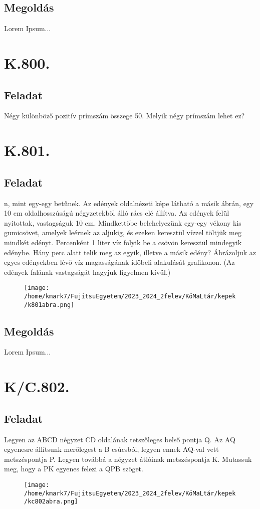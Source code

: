 \documentclass[a4paper,12pt]{article}
\begin{document}
\subsection*{Megoldás}
Lorem Ipsum...

\section*{\Large K.800.}\label{par:2}
\subsection*{Feladat}
Négy különböző pozitív prímszám összege 50. Melyik négy prímszám lehet ez?

\section*{\Large K.801.}\label{par:3}
\subsection*{Feladat}
n, mint egy-egy betűnek. Az edények oldalnézeti képe látható a másik ábrán, egy 10 cm oldalhosszúságú négyzetekből álló rács elé állítva. Az edények felül nyitottak, vastagságuk 10 cm. Mindkettőbe belehelyezünk egy-egy vékony kis gumicsövet, amelyek leérnek az aljukig, és ezeken keresztül vízzel töltjük meg mindkét edényt. Percenként 1 liter víz folyik be a csövön keresztül mindegyik edénybe. Hány perc alatt telik meg az egyik, illetve a másik edény? Ábrázoljuk az egyes edényekben lévő víz magasságának időbeli alakulását grafikonon. (Az edények falának vastagságát hagyjuk figyelmen kívül.) 
\begin{figure}[htp]
\centering
\texttt{[image: /home/kmark7/FujitsuEgyetem/2023\_2024\_2felev/KöMaLtár/kepek/k801abra.png]}
\label{}
\end{figure}
\subsection*{Megoldás}
Lorem Ipsum...

\section*{\Large K/C.802.}\label{par:4}
\subsection*{Feladat}
Legyen az ABCD négyzet CD oldalának tetszőleges belső pontja Q. Az AQ egyenesre állítsunk merőlegest a B csúcsból, legyen ennek AQ-val vett metszéspontja P. Legyen továbbá a négyzet átlóinak metszéspontja K. Mutassuk meg, hogy a PK egyenes felezi a QPB szöget. 
\begin{figure}[htp]
\centering
\texttt{[image: /home/kmark7/FujitsuEgyetem/2023\_2024\_2felev/KöMaLtár/kepek/kc802abra.png]}
\label{}
\end{figure}
\end{document}
